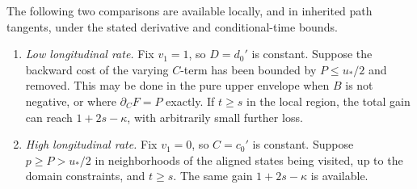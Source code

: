 \begin{lemma}\label{asp:longitudinal}
The following two comparisons are available locally, and in inherited
path tangents, under the stated derivative and conditional-time bounds.
\begin{enumerate}[label=(\roman*)]
\item \emph{Low longitudinal rate.} Fix \(v_1=1\), so \(D=d_0'\) is
constant. Suppose the backward cost of the varying \(C\)-term has been
bounded by \(P\le u_*/2\) and removed. This may be done in the pure upper
envelope when \(B\) is not negative, or where \(\partial_CF=P\) exactly.
If \(t\ge s\) in the local region, the total gain can reach
\(1+2s-\kappa\), with arbitrarily small further loss.
\item \emph{High longitudinal rate.} Fix \(v_1=0\), so \(C=c_0'\) is
constant. Suppose \(p\ge P>u_*/2\) in neighborhoods of the aligned states
being visited, up to the domain constraints, and \(t\ge s\). The same
gain \(1+2s-\kappa\) is available.
\end{enumerate}
\end{lemma}

